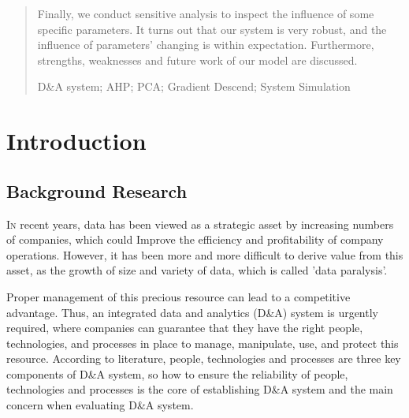 \documentclass{mcmthesis}
\begin{document}
\begin{abstract}
\noindent
Finally, we conduct sensitive analysis to inspect the influence of some specific parameters. It turns out that our system is very robust, and the influence of parameters' changing is within expectation. Furthermore, strengths, weaknesses and future work of our model are discussed.
    \begin{keywords}
         D\&A system; AHP; PCA; Gradient Descend; System Simulation
    \end{keywords}
\end{abstract}
\maketitle

    \tableofcontents
\newpage

\section{Introduction}
\subsection{Background Research}
\lettrine[lines=2]{I}{n} recent years, data has been viewed as a strategic asset by increasing numbers of companies, which could Improve the efficiency and profitability of company operations. However, it has been more and more difficult to derive value from this asset, as the growth of size and variety of data\cite{1}, which is called 'data paralysis'. 

Proper management of this precious resource can lead to a competitive advantage. Thus, an integrated data and analytics (D\&A) system is urgently required, where companies can guarantee that they have the right people, technologies, and processes in place to manage, manipulate, use, and protect this resource. According to literature, people, technologies and processes are three key components of D\&A system, so how to ensure the reliability of people, technologies and processes is the core of establishing D\&A system and the main concern when evaluating D\&A system.
\end{document}
